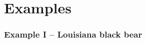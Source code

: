 \documentclass[color=usenames,dvipsnames]{beamer}
\begin{document}
\section{Examples}




\begin{frame}
  \frametitle{Example I -- Louisiana black bear}
  \begin{columns}
    \begin{column}{0.5\textwidth}
    \end{column}
    \begin{column}{0.5\textwidth}

\end{column}
\end{columns}
\end{frame}
\end{document}
